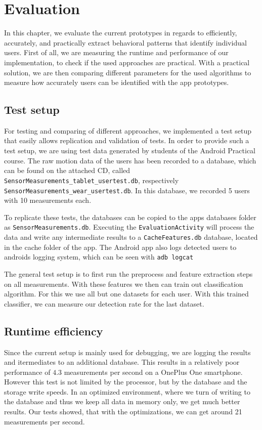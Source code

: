 \chapter{Evaluation}\label{chapter:evaluation}
In this chapter, we evaluate the current prototypes in regards to efficiently, accurately, and practically extract behavioral patterns that identify individual users. First of all, we are measuring the runtime and performance of our implementation, to check if the used approaches are practical. With a practical solution, we are then comparing different parameters for the used algorithms to measure how accurately users can be identified with the app prototypes.

\section{Test setup}
For testing and comparing of different approaches, we implemented a test setup that easily allows replication and validation of tests. In order to provide such a test setup, we are using test data generated by students of the Android Practical course. The raw motion data of the users has been recorded to a database, which can be found on the attached CD, called \lstinline$SensorMeasurements_tablet_usertest.db$, respectively \lstinline$SensorMeasurements_wear_usertest.db$. In this database, we recorded 5 users with 10 measurements each.

To replicate these tests, the databases can be copied to the apps databases folder as \lstinline$SensorMeasurements.db$. Executing the \lstinline$EvaluationActivity$ will process the data and write any intermediate results to a \lstinline$CacheFeatures.db$ database, located in the cache folder of the app. The Android app also logs detected users to androids logging system, which can be seen with \lstinline$adb logcat$

The general test setup is to first run the preprocess and feature extraction steps on all measurements. With these features we then can train out classification algorithm. For this we use all but one datasets for each user. With this trained classifier, we can measure our detection rate for the last dataset.

\section{Runtime efficiency}
Since the current setup is mainly used for debugging, we are logging the results and itermediates to an additional database. This results in a relatively poor performance of $4.3$ measurements per second on a OnePlus One smartphone. However this test is not limited by the processor, but by the database and the storage write speeds. In an optimized environment, where we turn of writing to the database and thus we keep all data in memory only, we get much better results. Our tests showed, that with the optimizations, we can get around 21 measurements per second.

